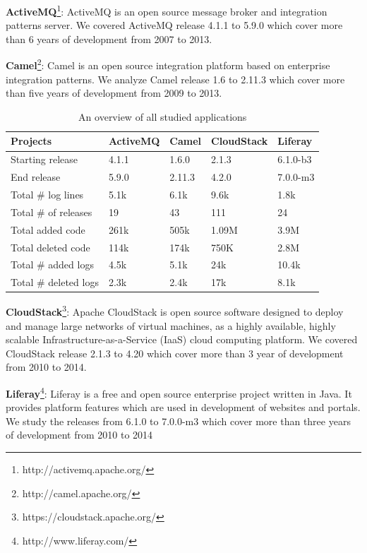 \textbf{ActiveMQ}\footnote[1]{http://activemq.apache.org/}: ActiveMQ is an open source message broker and integration patterns server. We covered ActiveMQ release 4.1.1 to 5.9.0 which cover more than 6 years of development from 2007 to 2013.

\textbf{Camel}\footnote[2]{http://camel.apache.org/}: Camel is an open source integration platform based on enterprise integration patterns. We analyze Camel release 1.6 to 2.11.3 which cover more than five years of development from 2009 to 2013. 

\begin{table}[tbh]
	\centering \protect\protect\caption{An overview of all studied applications}
	
	
	\label{tba:overviewsystems} %
	\begin{tabular}{lllll}
		\hline 
		Projects  & ActiveMQ  & Camel  & CloudStack  & Liferay \tabularnewline
		\hline 
		Starting release  & 4.1.1  & 1.6.0  & 2.1.3  & 6.1.0-b3 \tabularnewline
		End release  & 5.9.0  & 2.11.3  & 4.2.0  & 7.0.0-m3 \tabularnewline
		Total \# log lines  & 5.1k  & 6.1k  & 9.6k  & 1.8k \tabularnewline
		Total \# of releases  & 19  & 43  & 111  & 24 \tabularnewline
		Total added code  & 261k  & 505k  & 1.09M  & 3.9M \tabularnewline
		Total deleted code  & 114k  & 174k  & 750K  & 2.8M \tabularnewline
		Total \# added logs  & 4.5k  & 5.1k  & 24k  & 10.4k \tabularnewline
		Total \# deleted logs  & 2.3k  & 2.4k  & 17k  & 8.1k \tabularnewline
		\hline 
	\end{tabular}
\end{table}


\textbf{CloudStack}\footnote[3]{https://cloudstack.apache.org/}: Apache CloudStack is open source software designed to deploy and manage large networks of virtual machines, as a highly available, highly scalable Infrastructure-as-a-Service (IaaS) cloud computing platform. We covered CloudStack release 2.1.3 to 4.20 which cover more than 3 year of development from 2010 to 2014.


\textbf{Liferay}\footnote[4]{http://www.liferay.com/}:  Liferay is a free and open source enterprise project written in Java. It provides platform features which are used in development of websites and portals. We study the releases from 6.1.0 to 7.0.0-m3 which cover more than three years of development from 2010 to 2014
  

